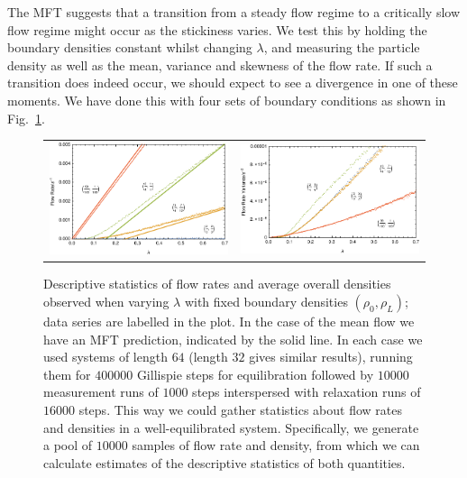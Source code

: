 The MFT suggests that a  transition from a steady flow regime to a critically slow flow regime might occur as the stickiness varies.
We test this by holding the boundary densities constant
whilst changing $\lambda$, and measuring the particle density as well as the mean, variance and skewness of the flow rate. If such a transition does indeed occur, we should expect to see a divergence in one of these moments.
We have done this with four sets of boundary conditions as shown in Fig.~\ref{fig:lambdaScans}. 
\iffalse
\begin{figure}[h!]
\vspace{1em}
\caption{\label{fig:lambdaScans} Descriptive statistics of flow rates and average overall densities observed when varying $\lambda$ with fixed boundary densities $(\rho_0, \rho_L)$; data series are labelled in the plot.
In the case of the mean flow we have an MFT prediction, indicated by the solid line.
In each case we used systems of length $64$ (length $32$ gives similar results),
running them for $400000$ Gillispie steps for equilibration followed by $10000$ measurement runs of $1000$ steps interspersed with relaxation runs of $16000$
steps. This way we could gather statistics about flow rates and densities in a well-equilibrated system. Specifically, we generate a pool of $10000$ samples of flow rate and density,
from which we can calculate estimates of the descriptive statistics of both quantities.}
\begin{center}
 \begin{tabular}{c|c}
    \includegraphics[width=0.5\linewidth]{../tex-src/images/lambdaScan/newFlowMean} & \includegraphics[width=0.5\linewidth]{../tex-src/images/lambdaScan/newFlowVar} \\

\end{tabular}
\end{center}
\end{figure}
